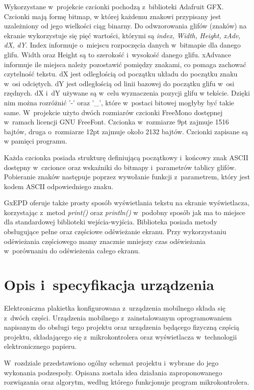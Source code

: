 \documentclass[a4paper,12pt, twoside]{article}
\begin{document}
        Wykorzystane w~projekcie czcionki pochodzą z~biblioteki Adafruit GFX. Czcionki mają formę bitmap, w której każdemu znakowi przypisany jest uzależniony od jego wielkości ciąg binarny. Do odwzorowania glifów (znaków) na ekranie wykorzystuje się pięć wartości, którymi są \textit{index,  Width, Height, xAdv, dX, dY}. Index informuje o~miejscu rozpoczęcia danych w~bitmapie dla danego glifu. Width oraz Height są to szerokość i~wysokość danego glifu. xAdvance informuje ile miejsca należy pozostawić pomiędzy znakami, co pomaga zachować czytelność tekstu. dX jest odległością od początku układu do początku znaku w~osi odciętych. dY jest odległością od linii bazowej do początku glifu w~osi rzędnych. dX i~dY używane są w~celu wyznaczenia pozycji glifu w tekście. Dzięki nim można rozróżnić '-' oraz '\_', które w~postaci bitowej mogłyby być takie same. W~projekcie użyto dwóch rozmiarów czcionki FreeMono dostępnej w~ramach licencji GNU FreeFont. Czcionka w~rozmiarze 9pt zajmuje 1516 bajtów, druga o~rozmiarze 12pt zajmuje około 2132 bajtów. Czcionki zapisane są w pamięci programu.
        
        Każda czcionka posiada strukturę definiującą początkowy i~końcowy znak ASCII dostępny w~czcionce oraz wskaźniki do bitmapy i~parametrów tablicy glifów. Pobieranie znaków następuje poprzez wywołanie funkcji z~parametrem, który jest kodem ASCII odpowiedniego znaku.
        
        GxEPD oferuje także prosty sposób wyświetlania tekstu na ekranie wyświetlacza, korzystając z~metod \textit{print()} oraz \textit{println()} w~podobny sposób jak ma to miejsce dla standardowej biblioteki wejścia-wyjścia. Biblioteka posiada metody obsługujące pełne oraz częściowe odświeżanie ekranu. Przy wykorzystaniu odświeżania częściowego mamy znacznie mniejszy czas odświeżania w~porównaniu do odświeżenia całego ekranu.
        
        \newpage
    	\section{Opis i~specyfikacja urządzenia}
    	Elektroniczna plakietka konfigurowana z~urządzenia mobilnego składa się z~dwóch części. Urządzenia mobilnego z~zainstalowanym oprogramowaniem napisanym do obsługi tego projektu oraz urządzenia będącego fizyczną częścią projektu, składającego się z~mikrokontrolera oraz wyświetlacza w~technologii elektronicznego papieru.
    
        W~rozdziale przedstawiono ogólny schemat projektu i~wybrane do jego wykonania podzespoły. Opisana została idea działania zaproponowanego rozwiązania oraz algorytm, według którego funkcjonuje program mikrokontrolera.
        
\end{document}
